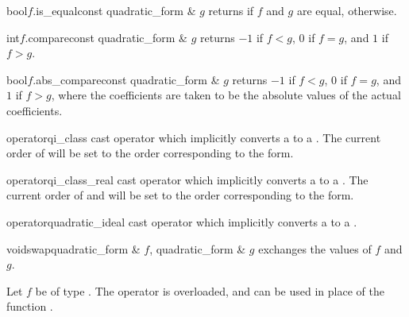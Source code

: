\begin{cfcode}{bool}{$f$.is_equal}{const quadratic_form & $g$}
  returns \TRUE if $f$ and $g$ are equal, \FALSE otherwise.
\end{cfcode}

\begin{cfcode}{int}{$f$.compare}{const quadratic_form & $g$}
  returns $-1$ if $f < g$, $0$ if $f = g$, and $1$ if $f > g$.
\end{cfcode}

\begin{cfcode}{bool}{$f$.abs_compare}{const quadratic_form & $g$}
  returns $-1$ if $f < g$, $0$ if $f = g$, and $1$ if $f > g$, where the coefficients are taken
  to be the absolute values of the actual coefficients.
\end{cfcode}



\BASIC

\begin{cfcode}{operator}{qi_class}{}
  cast operator which implicitly converts a  to a .  The
  current order of  will be set to the order corresponding to the form.
\end{cfcode}

\begin{cfcode}{operator}{qi_class_real}{}
  cast operator which implicitly converts a  to a .  The
  current order of  and  will be set to the order
  corresponding to the form.
\end{cfcode}

\begin{cfcode}{operator}{quadratic_ideal}{}
  cast operator which implicitly converts a  to a .
\end{cfcode}

\begin{fcode}{void}{swap}{quadratic_form & $f$, quadratic_form & $g$}
  exchanges the values of $f$ and $g$.
\end{fcode}



\HIGH

Let $f$ be of type .  The operator \code{()} is overloaded, and can be used
in place of the function .

